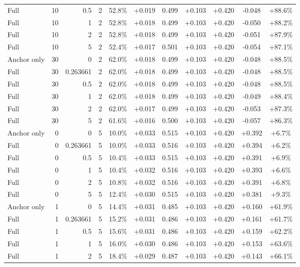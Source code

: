 \begin{table}[htbp]
\begin{tabular}{lrrrccccccc}
Full & 10 & 0.5 & 2 & 52.8\% & +0.019 & 0.499 & +0.103 & +0.420 & -0.048 & +88.6\% \\
Full & 10 & 1 & 2 & 52.8\% & +0.018 & 0.499 & +0.103 & +0.420 & -0.050 & +88.2\% \\
Full & 10 & 2 & 2 & 52.8\% & +0.018 & 0.499 & +0.103 & +0.420 & -0.051 & +87.9\% \\
Full & 10 & 5 & 2 & 52.4\% & +0.017 & 0.501 & +0.103 & +0.420 & -0.054 & +87.1\% \\
Anchor only & 30 & 0 & 2 & 62.0\% & +0.018 & 0.499 & +0.103 & +0.420 & -0.048 & +88.5\% \\
Full & 30 & 0.263661 & 2 & 62.0\% & +0.018 & 0.499 & +0.103 & +0.420 & -0.048 & +88.5\% \\
Full & 30 & 0.5 & 2 & 62.0\% & +0.018 & 0.499 & +0.103 & +0.420 & -0.048 & +88.5\% \\
Full & 30 & 1 & 2 & 62.0\% & +0.018 & 0.499 & +0.103 & +0.420 & -0.049 & +88.4\% \\
Full & 30 & 2 & 2 & 62.0\% & +0.017 & 0.499 & +0.103 & +0.420 & -0.053 & +87.3\% \\
Full & 30 & 5 & 2 & 61.6\% & +0.016 & 0.500 & +0.103 & +0.420 & -0.057 & +86.3\% \\
Anchor only & 0 & 0 & 5 & 10.0\% & +0.033 & 0.515 & +0.103 & +0.420 & +0.392 & +6.7\% \\
Full & 0 & 0.263661 & 5 & 10.0\% & +0.033 & 0.516 & +0.103 & +0.420 & +0.394 & +6.2\% \\
Full & 0 & 0.5 & 5 & 10.4\% & +0.033 & 0.515 & +0.103 & +0.420 & +0.391 & +6.9\% \\
Full & 0 & 1 & 5 & 10.4\% & +0.032 & 0.516 & +0.103 & +0.420 & +0.393 & +6.6\% \\
Full & 0 & 2 & 5 & 10.8\% & +0.032 & 0.516 & +0.103 & +0.420 & +0.391 & +6.8\% \\
Full & 0 & 5 & 5 & 12.4\% & +0.030 & 0.515 & +0.103 & +0.420 & +0.381 & +9.3\% \\
Anchor only & 1 & 0 & 5 & 14.4\% & +0.031 & 0.485 & +0.103 & +0.420 & +0.160 & +61.9\% \\
Full & 1 & 0.263661 & 5 & 15.2\% & +0.031 & 0.486 & +0.103 & +0.420 & +0.161 & +61.7\% \\
Full & 1 & 0.5 & 5 & 15.6\% & +0.031 & 0.486 & +0.103 & +0.420 & +0.159 & +62.2\% \\
Full & 1 & 1 & 5 & 16.0\% & +0.030 & 0.486 & +0.103 & +0.420 & +0.153 & +63.6\% \\
Full & 1 & 2 & 5 & 18.4\% & +0.029 & 0.487 & +0.103 & +0.420 & +0.143 & +66.1\% \\

\end{tabular}
\end{table}
